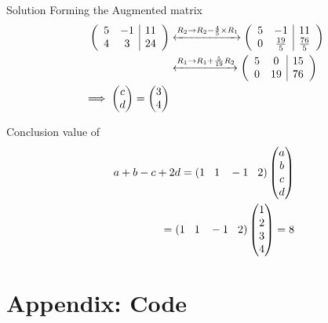 \documentclass{beamer}
\numberwithin{equation}{section}
\providecommand{\brak}[1]{\ensuremath{\left(#1\right)}}
\theoremstyle{remark}
\newcommand{\myvec}[1]{\ensuremath{\begin{pmatrix}#1\end{pmatrix}}}
\begin{document}
    \begin{frame}{Solution}
Forming the Augmented matrix
    \begin{align}
       \left(\begin{array}{cc|c}
        5 & -1 & 11\\
        4 & 3 & 24
\end{array}\right) &\xleftrightarrow{R_2 \rightarrow R_2-\frac{4}{5}\times R_1}
\left(\begin{array}{cc|c} 
        5 & -1 & 11\\
        0 & \frac{19}{5} & \frac{76}{5}
\end{array}\right) \\
&\xleftrightarrow{R_1 \rightarrow R_1+ \frac{5}{19}R_2} \left(\begin{array}{cc|c}
        5 & 0 & 15\\
        0 & 19 & 76
\end{array}\right)\\
\implies \myvec{c\\d}=\myvec{3\\4}
    \end{align}
 \end{frame}

 \begin{frame}{Conclusion}
     value of 
    \begin{align}
    a+b-c+2d=    \brak{1\hspace{0.3cm}1\hspace{0.3cm}-1\hspace{0.3cm}2}\myvec{a\\b\\c\\d}\\=\brak{1\hspace{0.3cm}1\hspace{0.3cm}-1\hspace{0.3cm}2}\myvec{1\\2\\3\\4}=8
    \end{align}
 \end{frame}

\section*{Appendix: Code}
\end{document}

